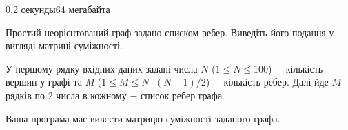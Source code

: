 \begin{problem}{}{}{}{0.2 секунды}{64 мегабайта}

Простий неорієнтований граф задано списком ребер. Виведіть його подання у вигляді матриці суміжності.

\InputFile
У першому рядку вхідних даних задані числа $N$ ($1 \le N \le 100$) $-$ кількість вершин у графі та 
$M$ ($1 \le M \le N\cdot(N-1)/2$) $-$ кількість ребер.
Далі йде $M$ рядків по $2$ числа в кожному $-$ список ребер графа. 

\OutputFile
Ваша програма має вивести матрицю суміжності заданого графа.

\Example

\begin{example}
%
\end{example}

\end{problem}

